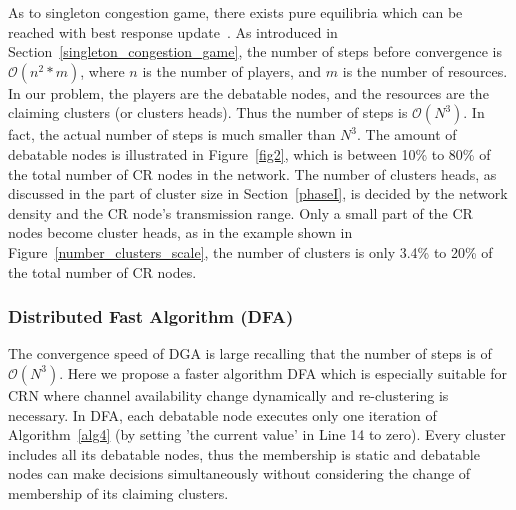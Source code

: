 As to singleton congestion game, there exists pure equilibria which can be reached with best response update~\cite{Ackermann06purenash}.
As introduced in Section~\ref{singleton_congestion_game}, the number of steps before convergence is $\mathcal{O}(n^2*m)$, where $n$ is the number of players, and $m$ is the number of resources.
In our problem, the players are the debatable nodes, and the resources are the claiming clusters (or clusters heads).
Thus the number of steps is $\mathcal{O}(N^3)$.
In fact, the actual number of steps is much smaller than $N^3$.
The amount of debatable nodes is illustrated in Figure~\ref{fig2}, which is between 10\% to 80\% of the total number of CR nodes in the network.
The number of clusters heads, as discussed in the part of cluster size in Section~\ref{phaseI}, is decided by the network density and the CR node's transmission range.
Only a small part of the CR nodes become cluster heads, as in the example shown in Figure~\ref{number_clusters_scale}, the number of clusters is only 3.4\% to 20\% of the total number of CR nodes.




\subsubsection{Distributed Fast Algorithm (DFA)}
The convergence speed of DGA is large recalling that the number of steps is of $\mathcal{O}(N^3)$.
Here we propose a faster algorithm DFA which is especially suitable for CRN where channel availability change dynamically and re-clustering is necessary. %
In DFA, each debatable node executes only one iteration of Algorithm~\ref{alg4} (by setting 'the current value' in Line 14 to zero).
Every cluster includes all its debatable nodes, thus the membership is static and debatable nodes can make decisions simultaneously without considering the change of membership of its claiming clusters.

